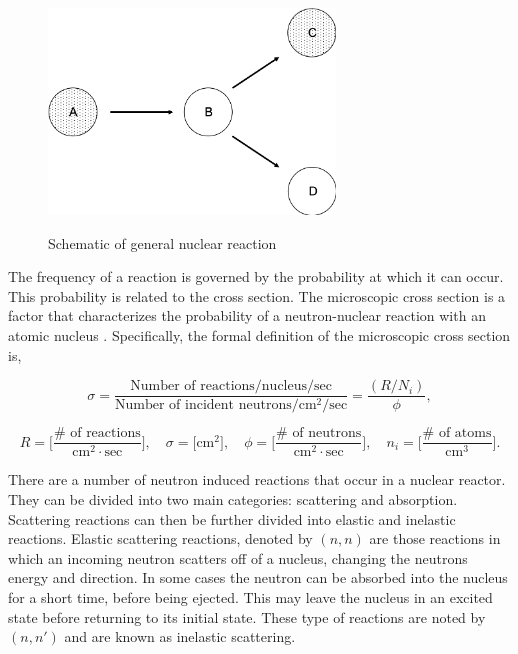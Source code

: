 \begin{figure}[b]
  \centering
  \includegraphics[width=3.0in]{images/chapter-2/nuclearReaction.png}\\
  \caption{Schematic of general nuclear reaction}
  \label{fig:nuclearReaction}
\end{figure} 

The frequency of a reaction is governed by the probability at which it can occur. This probability is related to the  cross section. The microscopic cross section is a factor that characterizes the probability of a neutron-nuclear reaction with an atomic nucleus \cite{duderstadt1976}. Specifically, the formal definition of the microscopic cross section is,

\begin{equation}
    \sigma = \frac{\text{Number of reactions} / \text{nucleus} / \text{sec}}{\text{Number of incident neutrons} / \text{cm}^{2} / \text{sec}} = \frac{(R/N_{i})}{\phi},
\end{equation}

\begin{equation*}
    R = \bigg[\frac{\# \text{ of reactions}}{\text{cm}^{2}\cdot \text{sec}}\bigg], \quad \sigma = \big[\text{cm}^{2}\big], \quad \phi = \bigg[\frac{\# \text{ of neutrons}}{\text{cm}^{2}\cdot \text{sec}} \bigg], \quad n_{i} = \bigg[\frac{\# \text{ of atoms}}{\text{cm}^{3}}\bigg].
\end{equation*}

There are a number of neutron induced reactions that occur in a nuclear reactor. They can be divided into two main categories: scattering and absorption. Scattering reactions can then be further divided into elastic and inelastic reactions. Elastic scattering reactions, denoted by $(n,n)$ are those reactions in which an incoming neutron scatters off of a nucleus, changing the neutrons energy and direction. In some cases the neutron can be absorbed into the nucleus for a short time, before being ejected. This may leave the nucleus in an excited state before returning to its initial state. These type of reactions are noted by $(n,n')$ and are known as inelastic scattering. 


